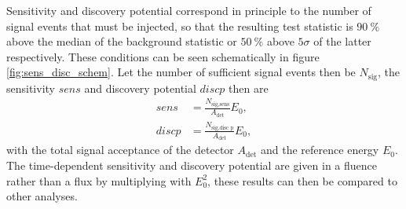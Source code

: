 Sensitivity and discovery potential correspond in principle to the number of signal events that must be injected, so that the resulting test statistic is $\SI{90}{\percent}$ above the median of the background statistic or $\SI{50}{\percent}$ above $\num{5}\sigma$ of the latter respectively.
These conditions can be seen schematically in figure \ref{fig:sens_disc_schem}.
Let the number of sufficient signal events then be $N_\text{sig}$, the sensitivity $sens$ and discovery potential $disc p$ then are
\begin{align}
  sens &= \frac{N_\text{sig,sens}}{A_\text{det}}E_0, \\
  disc p &= \frac{N_\text{sig,disc p}}{A_\text{det}}E_0,
\end{align}
with the total signal acceptance of the detector $A_\text{det}$ and the reference energy $E_0$.
The time-dependent sensitivity and discovery potential are given in a fluence rather than a flux by multiplying with $E_0^2$, these results can then be compared to other analyses.
